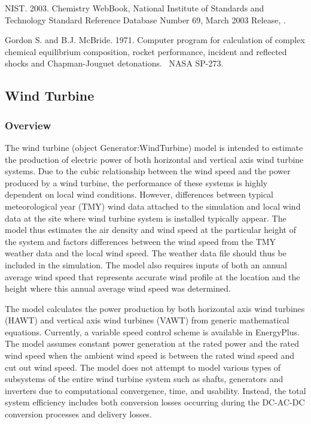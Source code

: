 NIST. 2003. Chemistry WebBook, National Institute of Standards and Technology Standard Reference Database Number 69, March 2003 Release, .

Gordon S. and B.J. McBride. 1971. Computer program for calculation of complex chemical equilibrium composition, rocket performance, incident and reflected shocks and Chapman-Jouguet detonations.~ NASA SP-273.

\subsection{Wind Turbine}\label{wind-turbine}

\subsubsection{Overview}\label{overview-017}

The wind turbine (object Generator:WindTurbine) model is intended to estimate the production of electric power of both horizontal and vertical axis wind turbine systems. Due to the cubic relationship between the wind speed and the power produced by a wind turbine, the performance of these systems is highly dependent on local wind conditions. However, differences between typical meteorological year (TMY) wind data attached to the simulation and local wind data at the site where wind turbine system is installed typically appear. The model thus estimates the air density and wind speed at the particular height of the system and factors differences between the wind speed from the TMY weather data and the local wind speed. The weather data file should thus be included in the simulation. The model also requires inputs of both an annual average wind speed that represents accurate wind profile at the location and the height where this annual average wind speed was determined.

The model calculates the power production by both horizontal axis wind turbines (HAWT) and vertical axis wind turbines (VAWT) from generic mathematical equations. Currently, a variable speed control scheme is available in EnergyPlus. The model assumes constant power generation at the rated power and the rated wind speed when the ambient wind speed is between the rated wind speed and cut out wind speed. The model does not attempt to model various types of subsystems of the entire wind turbine system such as shafts, generators and inverters due to computational convergence, time, and usability. Instead, the total system efficiency includes both conversion losses occurring during the DC-AC-DC conversion processes and delivery losses.

